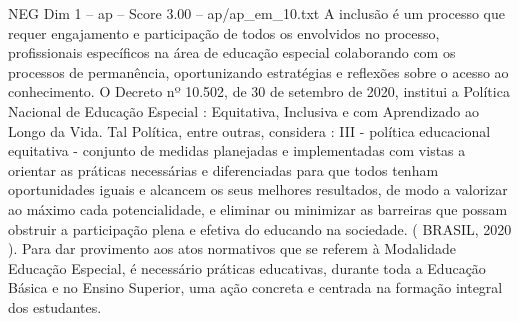 \begin{textsample}{NEG Dim 1 – ap – Score 3.00 – ap/ap\_em\_10.txt}
A inclusão é um processo que requer engajamento e participação de todos os envolvidos no processo, profissionais específicos na área de educação especial colaborando com os processos de permanência, oportunizando estratégias e reflexões sobre o acesso ao conhecimento.
O Decreto nº 10.502, de 30 de setembro de 2020, institui a Política Nacional de Educação Especial : Equitativa, Inclusiva e com Aprendizado ao Longo da Vida.
Tal Política, entre outras, considera : III - política educacional equitativa - conjunto de medidas planejadas e implementadas com vistas a orientar as práticas necessárias e diferenciadas para que todos tenham oportunidades iguais e alcancem os seus melhores resultados, de modo a valorizar ao máximo cada potencialidade, e eliminar ou minimizar as barreiras que possam obstruir a participação plena e efetiva do educando na sociedade. ( BRASIL, 2020 ).
Para dar provimento aos atos normativos que se referem à Modalidade Educação Especial, é necessário práticas educativas, durante toda a Educação Básica e no Ensino Superior, uma ação concreta e centrada na formação integral dos estudantes.

\end{textsample}
